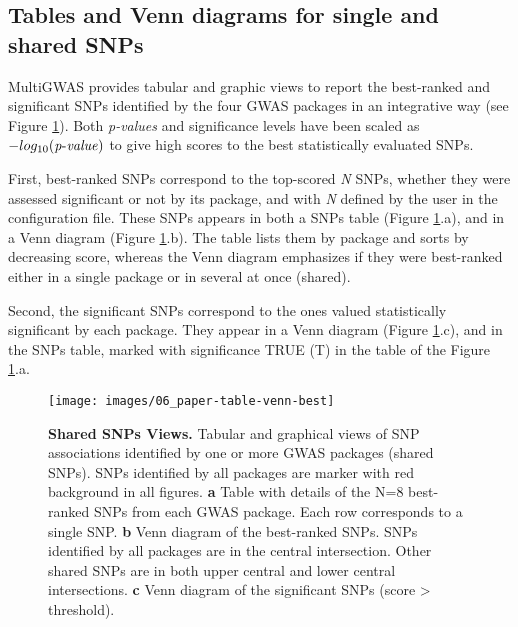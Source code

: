 \documentclass{article}
\begin{document}

\subsection{Tables and Venn diagrams for single and shared SNPs}

MultiGWAS provides tabular and graphic views to report the best-ranked and significant SNPs identified by the four GWAS packages in an integrative way (see Figure \ref{fig:Table-Shared-SNPs}). Both \emph{p-values} and significance levels have been scaled as $-log_{10}({\operatorname{\mathit{p-value}}})$ to give high scores to the best statistically evaluated SNPs.

First, best-ranked SNPs correspond to the top-scored \emph{N} SNPs, whether they were assessed significant or not by its package, and with\emph{ N} defined by the user in the configuration file. These SNPs appears in both a SNPs table (Figure \ref{fig:Table-Shared-SNPs}.a), and in a Venn diagram (Figure \ref{fig:Table-Shared-SNPs}.b). The table lists them by package and sorts by decreasing score, whereas the Venn diagram emphasizes if they were best-ranked either in a single package or in several at once (shared).

Second, the significant SNPs correspond to the ones valued statistically significant by each package. They appear in a Venn diagram (Figure \ref{fig:Table-Shared-SNPs}.c), and in the SNPs table, marked with significance TRUE (T) in the table of the Figure \ref{fig:Table-Shared-SNPs}.a.

\begin{figure}[H]
\begin{centering}
\texttt{[image: images/06\_paper-table-venn-best]} 
\par\end{centering}
\caption{\textbf{Shared SNPs Views.} Tabular and graphical views of SNP associations identified by one or more GWAS packages (shared SNPs). SNPs identified by all packages are marker with red background in all figures. \textbf{a} Table with details of the N=8 best-ranked SNPs from each GWAS package. Each row corresponds to a single SNP. \textbf{b} Venn diagram of the best-ranked SNPs. SNPs identified by all packages are in the central intersection. Other shared SNPs are in both upper central and lower central intersections. \textbf{c} Venn diagram of the significant SNPs (score \textgreater{} threshold). \label{fig:Table-Shared-SNPs}}
\end{figure}
\end{document}
